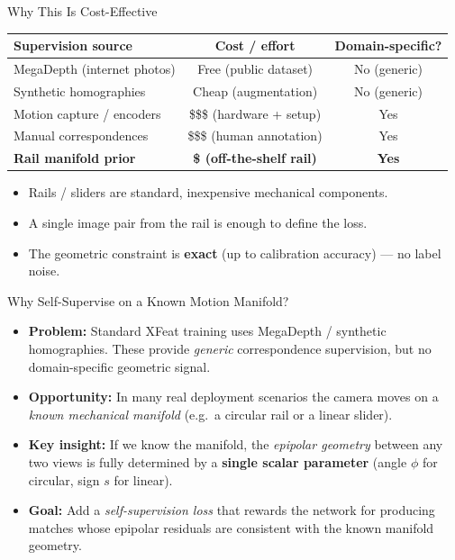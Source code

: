 \documentclass[aspectratio=169, 12pt]{beamer}
\begin{document}
\begin{frame}{Why This Is Cost-Effective}
\small
\begin{center}
\begin{tabular}{lcc}
\toprule
\textbf{Supervision source} & \textbf{Cost / effort} & \textbf{Domain-specific?} \\
\midrule
MegaDepth (internet photos) & Free (public dataset) & No (generic) \\
Synthetic homographies & Cheap (augmentation) & No (generic) \\
Motion capture / encoders & \$\$\$ (hardware + setup) & Yes \\
Manual correspondences & \$\$\$ (human annotation) & Yes \\
\midrule
\textbf{Rail manifold prior} & \textbf{\$ (off-the-shelf rail)} & \textbf{Yes} \\
\bottomrule
\end{tabular}
\end{center}

\vspace{0.3em}
\begin{itemize}\setlength{\itemsep}{2pt}
    \item Rails / sliders are standard, inexpensive mechanical components.
    \item A single image pair from the rail is enough to define the loss.
    \item The geometric constraint is \textbf{exact} (up to calibration accuracy) --- no label noise.
\end{itemize}
\end{frame}

\begin{frame}{Why Self-Supervise on a Known Motion Manifold?}
\small
\begin{itemize}\setlength{\itemsep}{4pt}
    \item \textbf{Problem:} Standard XFeat training uses MegaDepth / synthetic homographies.
          These provide \emph{generic} correspondence supervision, but no domain-specific geometric signal.
    \item \textbf{Opportunity:} In many real deployment scenarios the camera moves on a
          \emph{known mechanical manifold} (e.g.\ a circular rail or a linear slider).
    \item \textbf{Key insight:} If we know the manifold, the \emph{epipolar geometry}
          between any two views is fully determined by a \textbf{single scalar parameter}
          (angle $\phi$ for circular, sign $s$ for linear).
    \item \textbf{Goal:} Add a \emph{self-supervision loss} that rewards the network for
          producing matches whose epipolar residuals are consistent with the known manifold geometry.
\end{itemize}
\end{frame}
\end{document}
